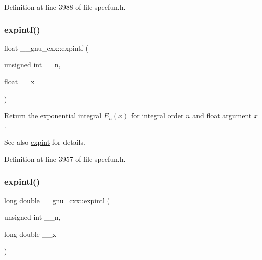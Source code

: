 Definition at line 3988 of file specfun.\+h.

\mbox{\label{group__gnu__math__spec__func_ga85751691a29807d99e990fcba61312f3}} 
\subsubsection{\texorpdfstring{expintf()}{expintf()}}
{\footnotesize\ttfamily float \+\_\+\+\_\+gnu\+\_\+cxx\+::expintf (\begin{DoxyParamCaption}\item[{unsigned int}]{\+\_\+\+\_\+n,  }\item[{float}]{\+\_\+\+\_\+x }\end{DoxyParamCaption})\hspace{0.3cm}{\ttfamily [inline]}}

Return the exponential integral $ E_n(x) $ for integral order $ n $ and {\ttfamily float} argument $ x $.

\begin{DoxySeeAlso}{See also}
\hyperlink{group__gnu__math__spec__func_gadaf9317953b826975da72d1858f01ea5}{expint} for details. 
\end{DoxySeeAlso}


Definition at line 3957 of file specfun.\+h.

\mbox{\label{group__gnu__math__spec__func_ga720ca0b275784c8b82193f427a2b3553}} 
\subsubsection{\texorpdfstring{expintl()}{expintl()}}
{\footnotesize\ttfamily long double \+\_\+\+\_\+gnu\+\_\+cxx\+::expintl (\begin{DoxyParamCaption}\item[{unsigned int}]{\+\_\+\+\_\+n,  }\item[{long double}]{\+\_\+\+\_\+x }\end{DoxyParamCaption})\hspace{0.3cm}{\ttfamily [inline]}}

